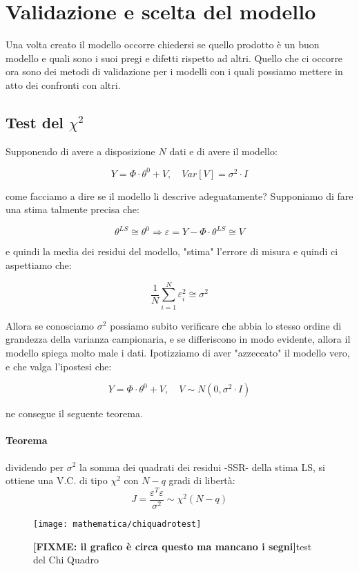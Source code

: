 \section{Validazione e scelta del modello}
Una volta creato il modello occorre chiedersi se quello prodotto è un buon modello e quali sono i suoi pregi e difetti rispetto ad altri. Quello che ci occorre ora sono dei metodi di validazione per i modelli con i quali possiamo mettere in atto dei confronti con altri. 
\subsection{Test del $\chi^2$}
Supponendo di avere a disposizione $N$ dati e di avere il modello:

    \[ Y=\Phi\cdot\theta^0+V, \quad Var[V]=\sigma^2\cdot I \]

come facciamo a dire se il modello li descrive adeguatamente? Supponiamo di fare una stima talmente precisa che:

    \[ \theta^{LS}\cong\theta^0 \Longrightarrow \varepsilon =Y-\Phi\cdot\theta^{LS}\cong V \]

e quindi la media dei residui del modello, "stima" l'errore di misura e quindi ci aspettiamo che:

    \[ \frac{1}{N}\sum_{i=1}^{N}{\varepsilon_i^2}\cong\sigma^2 \]

Allora se conosciamo $\sigma^2$ possiamo subito verificare che abbia lo stesso ordine di grandezza della varianza campionaria, e se differiscono in modo evidente, allora il modello spiega molto male i dati.
Ipotizziamo di aver "azzeccato" il modello vero, e che valga l'ipostesi che:

    \[ Y=\Phi\cdot\theta^0+V,  \quad  V\sim N(0,\sigma^2\cdot I) \]

ne consegue il seguente teorema.
\paragraph{Teorema} dividendo per $\sigma^2$ la somma dei quadrati dei residui -SSR- della stima LS, si ottiene una V.C. di tipo $\chi^2$ con $N-q$ gradi di libertà:
  \[ J=\frac{\varepsilon^T\varepsilon}{\sigma^2}\sim \chi^2(N-q) \]

\begin{figure}[htbp]
  \centering
  \texttt{[image: mathematica/chiquadrotest]}
  \caption{\textbf{[FIXME: il grafico è circa questo ma mancano i segni]}test del Chi Quadro\label{fig:chiquadrotest}}
\end{figure}

